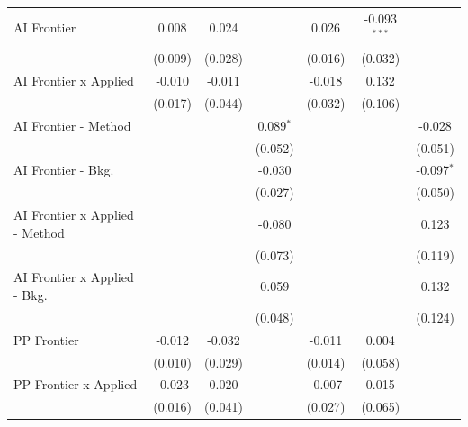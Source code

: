 \begin{tabular}{lcccccc}
   AI Frontier                    & 0.008        & 0.024       &              & 0.026        & -0.093$^{***}$ &   \\   
                                  & (0.009)      & (0.028)     &              & (0.016)      & (0.032)        &   \\   
   AI Frontier x Applied          & -0.010       & -0.011      &              & -0.018       & 0.132          &   \\   
                                  & (0.017)      & (0.044)     &              & (0.032)      & (0.106)        &   \\   
   AI Frontier - Method           &              &             & 0.089$^{*}$  &              &                & -0.028\\   
                                  &              &             & (0.052)      &              &                & (0.051)\\   
   AI Frontier - Bkg.             &              &             & -0.030       &              &                & -0.097$^{*}$\\   
                                  &              &             & (0.027)      &              &                & (0.050)\\   
   AI Frontier x Applied - Method &              &             & -0.080       &              &                & 0.123\\   
                                  &              &             & (0.073)      &              &                & (0.119)\\   
   AI Frontier x Applied - Bkg.   &              &             & 0.059        &              &                & 0.132\\   
                                  &              &             & (0.048)      &              &                & (0.124)\\   
   PP Frontier                    & -0.012       & -0.032      &              & -0.011       & 0.004          &   \\   
                                  & (0.010)      & (0.029)     &              & (0.014)      & (0.058)        &   \\   
   PP Frontier x Applied          & -0.023       & 0.020       &              & -0.007       & 0.015          &   \\   
                                  & (0.016)      & (0.041)     &              & (0.027)      & (0.065)        &   \\   

\end{tabular}
